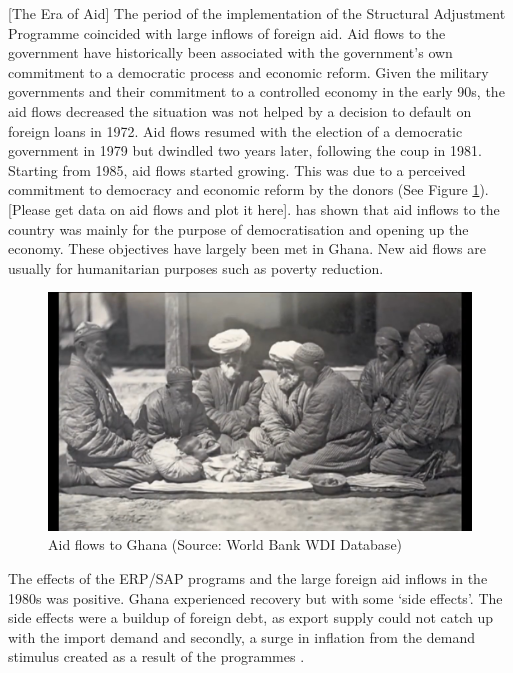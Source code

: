 \documentclass[a4paper, 12pt]{article}
\begin{document}
	[The Era of Aid]
	The period of the implementation of the Structural Adjustment Programme coincided with large inflows of foreign aid. Aid flows to the government have historically been associated with the government's own commitment to a democratic process and economic reform. Given the military governments and their commitment to a controlled economy in the early 90s, the aid flows decreased the situation was not helped by a decision to default on foreign loans in 1972. Aid flows resumed with the election of a democratic government in 1979 but dwindled two years later, following the coup in 1981. Starting from 1985, aid flows started growing. This was due to a perceived commitment to democracy and economic reform by the donors \cite{tsikata1999aid} (See Figure \ref{fig:aidflows}). [Please get data on aid flows and plot it here].  has shown that aid inflows to the country was mainly for the purpose of democratisation and opening up the economy. These objectives have largely been met in Ghana. New aid flows are usually for humanitarian purposes such as poverty reduction.
	
	\begin{figure}[h]
		\centering
		\includegraphics*{Data/mpv-shot0001.png}
		\caption[Aid flows to Ghana]{Aid flows to Ghana (Source: World Bank WDI Database)}
		\label{fig:aidflows}
	\end{figure}
	
	The effects of the ERP/SAP programs and the large foreign aid inflows in the 1980s was positive. Ghana experienced recovery but with some `side effects'. The side effects were a buildup of foreign debt, as export supply could not catch up with the import demand and secondly, a surge in inflation from the demand stimulus created as a result of the programmes \cite{StructuralAdj}.
	
\end{document}
